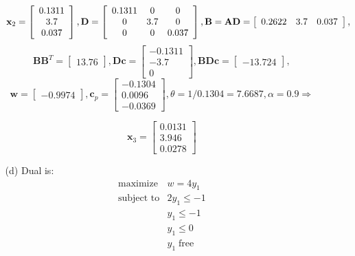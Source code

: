 \documentclass{article}
\begin{document}
\begin{enumerate}
\begin{itemize}
				\begin{displaymath}
					\mathbf{x}_2 = \left[ \begin{array}{c} 0.1311 \\ 3.7 \\ 0.037 \end{array} \right],
					\mathbf{D} = \left[ \begin{array}{c c c} 0.1311 & 0 & 0 \\ 0 & 3.7 & 0 \\ 0 & 0 & 0.037 \end{array} \right],
					\mathbf{B} = \mathbf{AD} = \left[ \begin{array}{c c c} 0.2622 & 3.7 & 0.037 \end{array} \right],
				\end{displaymath}
				\begin{displaymath}
					\mathbf{BB}^T = \left[ \begin{array}{c} 13.76 \end{array} \right], \mathbf{Dc} = \left[ \begin{array}{c} -0.1311 \\ -3.7 \\ 0 \end{array} \right], \mathbf{BDc} = \left[ \begin{array}{c} -13.724 \end{array} \right],
				\end{displaymath}
				\begin{displaymath}
					\mathbf{w} = \left[ \begin{array}{c} -0.9974 \end{array} \right], \mathbf{c}_p = \left[ \begin{array}{r} -0.1304 \\ 0.0096 \\ -0.0369 \end{array} \right], \theta = 1/0.1304 = 7.6687, \alpha = 0.9 \Rightarrow
				\end{displaymath}

				\begin{displaymath}
					\mathbf{x}_3 = \left[ \begin{array}{c} 0.0131 \\ 3.946 \\ 0.0278 \end{array} \right]
				\end{displaymath}

			\item [(d)] Dual is: \\
				\begin{displaymath}
					\begin{array}{ll}
					\textrm{maximize} & w = 4y_1 \\
					\textrm{subject to} & 2y_1 \le -1 \\
					& y_1 \le -1 \\
					& y_1 \le 0 \\
					& y_1 \; \mathrm{free}
					\end{array}
				\end{displaymath}


\end{itemize}
\end{enumerate}
\end{document}
